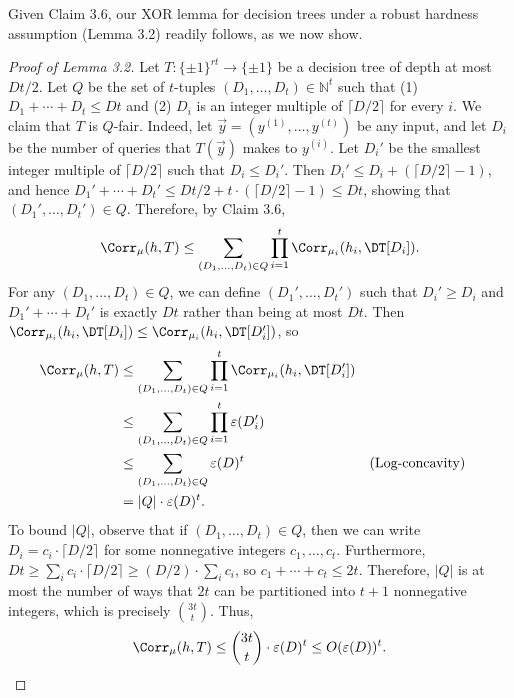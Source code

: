 Given Claim 3.6, our XOR lemma for decision trees under a robust hardness assumption (Lemma 3.2) readily follows, as we now show.
\begin{proof}[Proof of Lemma 3.2]
Let $T:\{\pm1\}^{rt}\to\{\pm1\}$ be a decision tree of depth at most $Dt/2$. Let $Q$ be the set of $t$-tuples $(D_1,\ldots,D_t)\in\mathbb N^t$ such that (1) $D_1+\cdots+D_t\le Dt$ and (2) $D_i$ is an integer multiple of $\lceil D/2\rceil$ for every $i$. We claim that $T$ is $Q$-fair. Indeed, let $\vec y=(y^{(1)},\ldots,y^{(t)})$ be any input, and let $D_i$ be the number of queries that $T(\vec y)$ makes to $y^{(i)}$. Let $D_i'$ be the smallest integer multiple of $\lceil D/2\rceil$ such that $D_i\le D_i'$. Then $D_i'\le D_i+(\lceil D/2\rceil-1)$, and hence $D_1'+\cdots+D_t'\le Dt/2+t\cdot(\lceil D/2\rceil-1)\le Dt$, showing that $(D_1',\ldots,D_t')\in Q$.
Therefore, by Claim 3.6,
\[\Corr_\mu(h,T)\le\sum_{(D_1,\ldots,D_t)\in Q}\prod_{i=1}^t\Corr_{\mu_i}(h_i,\DT[D_i]).\]
For any $(D_1,\ldots,D_t)\in Q$, we can define $(D_1',\ldots,D_t')$ such that $D_i'\ge D_i$ and $D_1'+\cdots+D_t'$ is exactly $Dt$ rather than being at most $Dt$. Then $\Corr_{\mu_i}(h_i,\DT[D_i])\le\Corr_{\mu_i}(h_i,\DT[D_i'])$, so
\begin{align*}
\Corr_\mu(h,T)&\le\sum_{(D_1,\ldots,D_t)\in Q}\prod_{i=1}^t\Corr_{\mu_i}(h_i,\DT[D_i'])\\
&\le\sum_{(D_1,\ldots,D_t)\in Q}\prod_{i=1}^t\varepsilon(D_i')\\
&\le\sum_{(D_1,\ldots,D_t)\in Q}\varepsilon(D)^t&&\text{(Log-concavity)}\\
&=|Q|\cdot\varepsilon(D)^t.
\end{align*}
To bound $|Q|$, observe that if $(D_1,\ldots,D_t)\in Q$, then we can write $D_i=c_i\cdot\lceil D/2\rceil$ for some nonnegative integers $c_1,\ldots,c_t$. Furthermore, $Dt\ge\sum_i c_i\cdot\lceil D/2\rceil\ge(D/2)\cdot\sum_i c_i$, so $c_1+\cdots+c_t\le2t$. Therefore, $|Q|$ is at most the number of ways that $2t$ can be partitioned into $t+1$ nonnegative integers, which is precisely $\binom{3t}{t}$. Thus,
\[\Corr_\mu(h,T)\le\binom{3t}{t}\cdot\varepsilon(D)^t\le O(\varepsilon(D))^t.\]
\end{proof}
